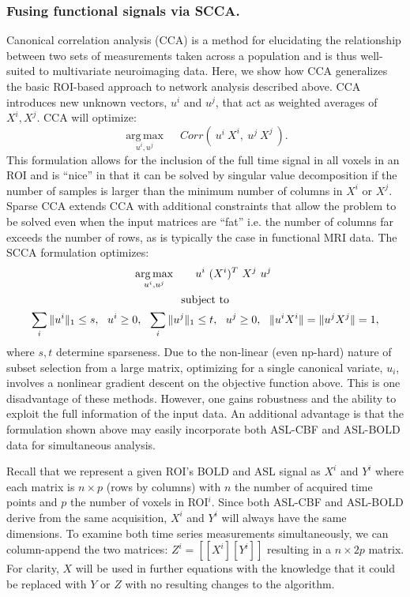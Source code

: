 \documentclass{llncs}
\begin{document}
\subsubsection{Fusing functional signals via SCCA.}
Canonical correlation analysis (CCA) is a method for elucidating the relationship between two sets of measurements taken across a population \cite{Hotelling1936} and is thus well-suited to multivariate neuroimaging data.  
Here, we show how CCA generalizes the basic ROI-based approach to network analysis described above.  CCA introduces new unknown vectors, $u^i$ and $u^j$, that act as weighted averages of $X^i, X^j$.  CCA will optimize:
\begin{equation}
\underset{u^i,u^j}{\operatorname{arg\,max}} \quad~ Corr(~u^i~X^i,~u^j~X^j~).
\end{equation}
This formulation allows for the inclusion of the full time signal in all voxels in an ROI and is ``nice'' in that it can be solved by singular value decomposition if the number of samples is larger than the minimum number of columns in $X^i$ or $X^j$. Sparse CCA extends CCA with additional constraints that allow the problem to be solved even when the input matrices are ``fat'' i.e. the number of columns far exceeds the number of rows, as is typically the case in functional MRI data.  The SCCA formulation optimizes: 
\begin{gather*}
\underset{u^i,u^j}{\operatorname{arg\,max}} \quad~ ~~u^i~(X^i)^T ~X^j~u^j~\\ \notag \text{subject to} \\ \notag
\sum_i \|u^i\|_1 \leq s, ~~ u^i \ge 0,~~ \sum_i \|u^j\|_1 \leq t, ~~ u^j \ge 0 , ~~\| u^i X^i \| = \| u^j X^j \| = 1,
\end{gather*}
where $s, t$ determine sparseness.  Due to the non-linear (even np-hard) nature of subset selection from a large matrix, optimizing for a single canonical variate, $u_i$, involves a nonlinear gradient descent on the objective function above.  This is one disadvantage of these methods.  However, one gains robustness and the ability to exploit the full information of the input data. An additional advantage is that the formulation shown above may easily incorporate both ASL-CBF and ASL-BOLD data for simultaneous analysis. 

Recall that we represent a given ROI's BOLD and ASL signal as $X^i$ and $Y^i$ where each matrix is $n \times p$ (rows by columns) with $n$ the number of acquired time points and $p$ the number of voxels in ROI$^i$. Since both ASL-CBF and ASL-BOLD derive from the same acquisition, $X^i$ and $Y^i$ will always have the same dimensions. To examine both time series measurements simultaneously, we can column-append the two matrices: $Z^i = \left[ \left[X^i\right] \left[Y^i\right] \right]$ resulting in a $n \times 2p$ matrix. For clarity, $X$ will be used in further equations with the knowledge that it could be replaced with $Y$ or $Z$ with no resulting changes to the algorithm.
\end{document}
